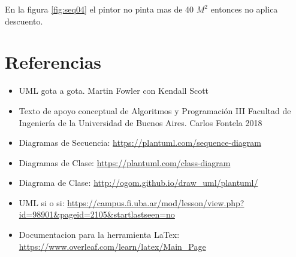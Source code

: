 \documentclass[titlepage,a4paper]{article}
\begin{document}
    En la figura \ref{fig:seq04} el pintor no pinta mas de 40 $M^2$ entonces no aplica descuento.

\newpage
\section{Referencias}

\begin{itemize}
  \item UML gota a gota. Martin Fowler con Kendall Scott
  \item Texto de apoyo conceptual de Algoritmos y Programación III Facultad de Ingeniería de la Universidad de Buenos Aires. Carlos Fontela 2018
  \item Diagramas de Secuencia: \url{https://plantuml.com/sequence-diagram}
  \item Diagramas de Clase: \url{https://plantuml.com/class-diagram}
  \item Diagrama de Clase: \url{http://ogom.github.io/draw_uml/plantuml/}
  \item UML si o si: \url{https://campus.fi.uba.ar/mod/lesson/view.php?id=98901&pageid=2105&startlastseen=no}
  \item Documentacion para la herramienta LaTex: \url{https://www.overleaf.com/learn/latex/Main_Page}
\end{itemize}
\end{document}

